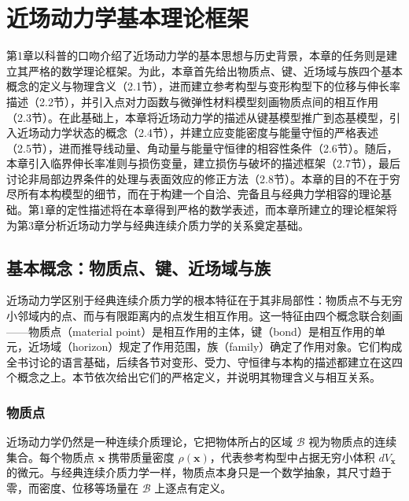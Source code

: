 \chapter{近场动力学基本理论框架}

\leavevmode\usetikzlibrary{arrows.meta, positioning, calc}

第1章以科普的口吻介绍了近场动力学的基本思想与历史背景，本章的任务则是建立其严格的数学理论框架。为此，本章首先给出物质点、键、近场域与族四个基本概念的定义与物理含义（2.1节），进而建立参考构型与变形构型下的位移与伸长率描述（2.2节），并引入点对力函数与微弹性材料模型刻画物质点间的相互作用（2.3节）。在此基础上，本章将近场动力学的描述从键基模型推广到态基模型，引入近场动力学状态的概念（2.4节），并建立应变能密度与能量守恒的严格表述（2.5节），进而推导线动量、角动量与能量守恒律的相容性条件（2.6节）。随后，本章引入临界伸长率准则与损伤变量，建立损伤与破坏的描述框架（2.7节），最后讨论非局部边界条件的处理与表面效应的修正方法（2.8节）。本章的目的不在于穷尽所有本构模型的细节，而在于构建一个自洽、完备且与经典力学相容的理论基础。第1章的定性描述将在本章得到严格的数学表述，而本章所建立的理论框架将为第3章分析近场动力学与经典连续介质力学的关系奠定基础。

\section{基本概念：物质点、键、近场域与族}

近场动力学区别于经典连续介质力学的根本特征在于其非局部性：物质点不与无穷小邻域内的点、而与有限距离内的点发生相互作用。这一特征由四个概念联合刻画——物质点（material point）是相互作用的主体，键（bond）是相互作用的单元，近场域（horizon）规定了作用范围，族（family）确定了作用对象。它们构成全书讨论的语言基础，后续各节对变形、受力、守恒律与本构的描述都建立在这四个概念之上。本节依次给出它们的严格定义，并说明其物理含义与相互关系。

\subsection{物质点}

近场动力学仍然是一种连续介质理论，它把物体所占的区域 $\mathcal{B}$ 视为物质点的连续集合。每个物质点 $\mathbf{x}$ 携带质量密度 $\rho(\mathbf{x})$，代表参考构型中占据无穷小体积 $dV_{\mathbf{x}}$ 的微元。与经典连续介质力学一样，物质点本身只是一个数学抽象，其尺寸趋于零，而密度、位移等场量在 $\mathcal{B}$ 上逐点有定义。

